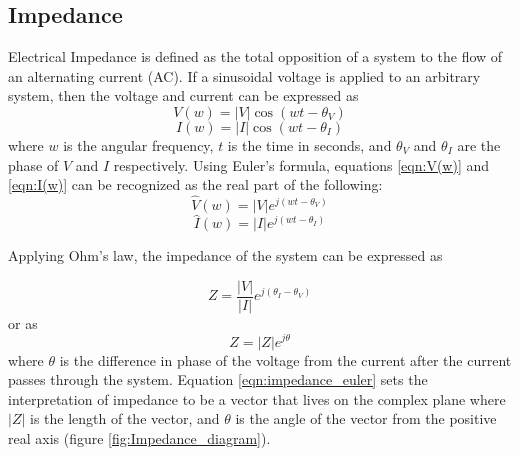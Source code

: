  \subsection*{Impedance}
 \par Electrical Impedance is defined as the total opposition of a system to the flow of an alternating current (AC). If a sinusoidal voltage is applied to an arbitrary system, then the voltage and current can be expressed as
 \begin{equation}
    V(w) = |V|\cos(wt-\theta_V)
    \label{eqn:V(w)}
 \end{equation}
 \begin{equation}
    I(w) = |I|\cos(wt - \theta_I)
    \label{eqn:I(w)}
 \end{equation}
 \noindent where $w$ is the angular frequency, $t$ is the time in seconds, and $\theta_V$ and $\theta_I$ are the phase of $V$ and $I$ respectively. Using Euler's formula, equations \ref{eqn:V(w)} and \ref{eqn:I(w)} can be recognized as the real part of the following:
 \begin{equation}
    \hat{V}(w) = |V|e^{j(wt-\theta_V)}
 \end{equation}
 \begin{equation}
     \hat{I}(w) = |I|e^{j(wt-\theta_I)}
 \end{equation}
 
 \noindent Applying Ohm's law, the impedance of the system can be expressed as
 
 \begin{equation}
    Z = \frac{|V|}{|I|}e^{j(\theta_I-\theta_V)}
 \end{equation}
 \noindent or as 
 \begin{equation}
     Z = |Z|e^{j\theta}
     \label{eqn:impedance_euler}
 \end{equation}
 \noindent where $\theta$ is the difference in phase of the voltage from the current after the current passes through the system. Equation \ref{eqn:impedance_euler} sets the interpretation of impedance to be a vector that lives on the complex plane where $|Z|$ is the length of the vector, and $\theta$ is the angle of the vector from the positive real axis (figure \ref{fig:Impedance_diagram}).
 
